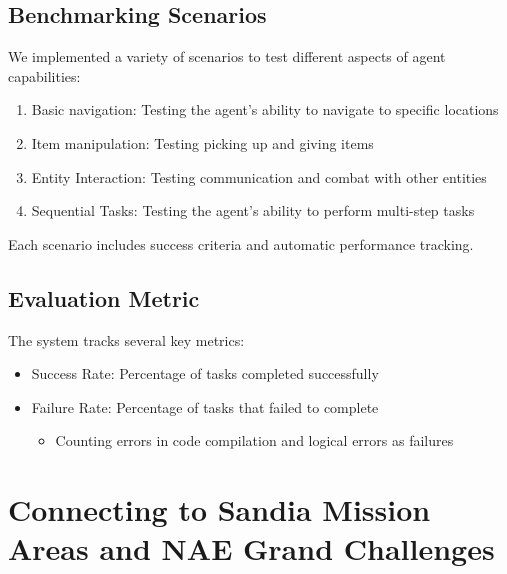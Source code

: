 \documentclass{article}
\begin{document}
\subsection{Benchmarking Scenarios}

We implemented a variety of scenarios to test different aspects of agent capabilities:
\begin{enumerate}
    \item Basic navigation: Testing the agent's ability to navigate to specific locations
    \item Item manipulation: Testing picking up and giving items
    \item Entity Interaction: Testing communication and combat with other entities
    \item Sequential Tasks: Testing the agent's ability to perform multi-step tasks
\end{enumerate}
Each scenario includes success criteria and automatic performance tracking.

\subsection{ Evaluation Metric}
The system tracks several key metrics:
\begin{itemize}
    \item Success Rate: Percentage of tasks completed successfully
    \item Failure Rate: Percentage of tasks that failed to complete
    \begin{itemize}
        \item Counting errors in code compilation and logical errors as failures
    \end{itemize}
\end{itemize}

\section{Connecting to Sandia Mission Areas and NAE Grand Challenges}
\end{document}
